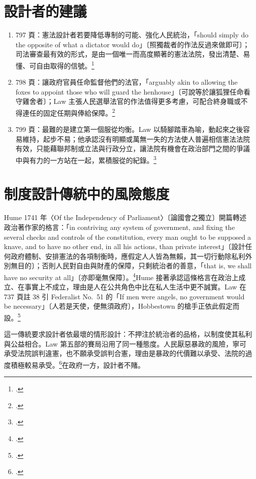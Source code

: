 \section{設計者的建議}
\label{sec:30_designer-2}

\begin{enumerate}
\tightlist
\item
  797 頁：憲法設計者若要降低專制的可能、強化人民統治，「should simply do the opposite of what a dictator would do」〔照獨裁者的作法反過來做即可〕；司法審查最有效的形式，是由一個唯一而高度顯著的憲法法院，發出清楚、易懂、可自由取得的信號。\footcite[797]{law2009}
\item
  798 頁：讓政府官員任命監督他們的法官，「arguably akin to allowing the foxes to appoint those who will guard the henhouse」〔可說等於讓狐狸任命看守雞舍者〕；Law 主張人民選舉法官的作法值得更多考慮，可配合終身職或不得連任的固定任期與俸給保障。\footcite[798]{law2009}
\item
  799 頁：最難的是建立第一個服從均衡。Law 以騎腳踏車為喻，動起來之後容易維持，起步不易；他承認沒有明顯或萬無一失的方法使人普遍相信憲法法院有效，只能藉聯邦制或立法與行政分立，讓法院有機會在政治部門之間的爭議中與有力的一方站在一起，累積服從的紀錄。\footcite[799]{law2009}
\end{enumerate}

\section{制度設計傳統中的風險態度}
\label{sec:30_designer-3}

Hume 1741 年〈Of the Independency of Parliament〉〔論國會之獨立〕開篇轉述政治著作家的格言：「in contriving any system of government, and fixing the several checks and controls of the constitution, every man ought to be supposed a knave, and to have no other end, in all his actions, than private interest」〔設計任何政府體制、安排憲法的各項制衡時，應假定人人皆為無賴，其一切行動除私利外別無目的〕；否則人民對自由與財產的保障，只剩統治者的善意，「that is, we shall have no security at all」〔亦即毫無保障〕。\footcite{hume1741}Hume 接著承認這條格言在政治上成立、在事實上不成立，理由是人在公共角色中比在私人生活中更不誠實。Law 在 737 頁註 38 引 Federalist No.~51 的「If men were angels, no government would be necessary」〔人若是天使，便無須政府〕，Hobbestown 的槍手正依此假定而設。\footcite[737 n.38]{law2009}

這一傳統要求設計者依最壞的情形設計：不押注於統治者的品格，以制度使其私利與公益相合。Law 第五部的賽局沿用了同一種態度。人民厭惡暴政的風險，寧可承受法院誤判違憲，也不願承受誤判合憲，理由是暴政的代價難以承受、法院的過度積極較易承受。\footcite[789--790]{law2009}在政府一方，設計者不賭。

